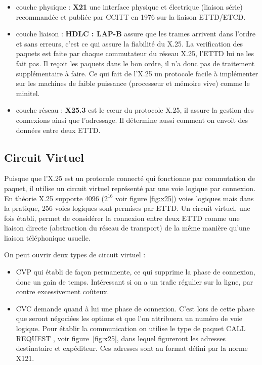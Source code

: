 \documentclass[12pt]{report}
\begin{document}
\begin{itemize}
\item couche physique : \textbf{X21} une interface physique et électrique (liaison série) recommandée et publiée par CCITT en 1976 sur la liaison ETTD/ETCD\cite{wikix21}.
\item couche liaison : \textbf{HDLC : LAP-B} assure que les trames arrivent dans l'ordre et sans erreurs, c'est ce qui assure la fiabilité du X.25. La verification des paquets est faite
par chaque commutateur du réseau X.25, l'ETTD lui ne les fait pas. Il reçoit les paquets dans le bon ordre, il n'a donc pas de traitement supplémentaire à faire. Ce qui fait de l'X.25 un protocole facile
à implémenter sur les machines de faible puissance (processeur et mémoire vive) comme le minitel\cite{wikilapb}.
\item couche réseau : \textbf{X25.3} est le cœur du protocole X.25, il assure la gestion des connexions ainsi que l'adressage\cite{gatoux}. Il détermine aussi comment on envoit des données entre deux ETTD.
\end{itemize}

\subsection{Circuit Virtuel}
Puisque que l'X.25 est un protocole connecté qui fonctionne par commutation de paquet, il utilise un circuit virtuel représenté par une voie logique par connexion. En théorie X.25 supporte 4096 ($2^{16}$ voir figure \ref{fig:x25}) voies logiques mais dans la pratique, 256 voies logiques sont permises par ETTD.
Un circuit virtuel, une fois établi, permet de considérer la connexion entre deux ETTD comme une liaison directe (abstraction du réseau de transport) de la même manière qu'une liaison téléphonique usuelle\cite{navarro}.

On peut ouvrir deux types de circuit virtuel :
\begin{itemize}
\item \gls{CVP} qui établi de façon permanente, ce qui supprime la phase de connexion, donc un gain de temps. Intéressant si on a un trafic régulier sur la ligne, par contre excessivement coûteux.
\item \gls{CVC} demande quand à lui une phase de connexion. C'est lors de cette phase que seront négociées les options et que l'on attribuera un numéro de voie logique. Pour établir la communication on utilise le type de paquet \og CALL REQUEST \fg, voir figure~\ref{fig:x25}, dans lequel figureront les adresses destinataire et expéditeur. Ces adresses sont au format défini par la norme X121\cite{navarro}\cite{gateau}.
\end{itemize}
\end{document}
